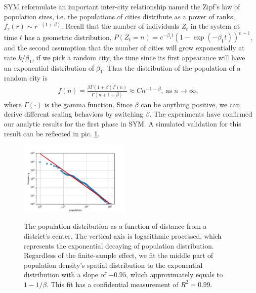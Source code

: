 \documentclass[reprint,unsortedaddress,amsmath,amssymb,floatfix,aps,prl,showkeys]{revtex4-2}
\begin{document}
SYM reformulate an important inter-city relationship named the Zipf's law of population sizes\cite{gabaix1999zipf's}, i.e. the populations of cities distribute as a power of ranks, $f_r(r)\sim r^{-(1+\beta)}$. Recall that the number of individuals $Z_t$ in the system at time $t$ has a geometric distribution\cite{durrett1999essentials}, $P(Z_t=n)=e^{-\beta_1t}(1-\exp(- {\beta_1} t))^{n-1}$, and the second assumption that the number of cities will grow exponentially at rate $k/\beta_1$, if we pick a random city, the time since its first appearance will have an exponential distribution of $\beta_1$. Thus the distribution of the population of a random city is 
\begin{align}
	f(n)=\frac{\beta\Gamma(1+\beta)\Gamma(n)}{\Gamma(n+1+\beta)}\approx Cn^{-1-\beta}, \ \text{as } n\rightarrow\infty,
\end{align}
where $\Gamma(\cdot)$ is the gamma function. Since $\beta$ can be anything positive, we can derive different scaling behaviors by switching $\beta$. The experiments have confirmed our analytic results for the first phase in SYM. A simulated validation for this result can be reflected in pic. \ref{fig:rankditribution}. 
\begin{figure}
    \centering
    \includegraphics[width=0.48\textwidth]{pics/zipf.pdf}
    \label{fig:rankditribution}
	\caption{The population distribution as a function of distance from a district's center. The vertical axis is logarithmic processed, which represents the exponential decaying of population distribution. Regardless of the finite-sample effect, we fit the middle part of population density's spatial distribution to the exponential distribution with a slope of $-0.95$, which approximately equals to $1-1/\beta$. This fit has a confidential measurement of $R^2=0.99$.}
\end{figure}




\end{document}
